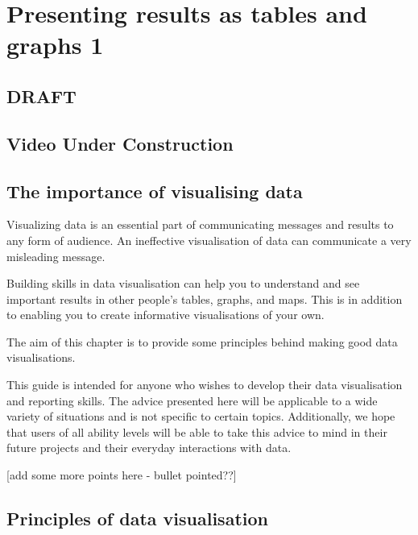 \documentclass[
]{book}
\begin{document}
\hypertarget{tablegraph1}{%
\chapter{Presenting results as tables and graphs 1}\label{tablegraph1}}

\hypertarget{draft}{%
\section{DRAFT}\label{draft}}

\hypertarget{video-under-construction}{%
\section{Video Under Construction}\label{video-under-construction}}

\hypertarget{the-importance-of-visualising-data}{%
\section{The importance of visualising data}\label{the-importance-of-visualising-data}}

Visualizing data is an essential part of communicating messages and results to any form of audience. An ineffective visualisation of data can communicate a very misleading message.

Building skills in data visualisation can help you to understand and see important results in other people's tables, graphs, and maps. This is in addition to enabling you to create informative visualisations of your own.

The aim of this chapter is to provide some principles behind making good data visualisations.

This guide is intended for anyone who wishes to develop their data visualisation and reporting skills. The advice presented here will be applicable to a wide variety of situations and is not specific to certain topics. Additionally, we hope that users of all ability levels will be able to take this advice to mind in their future projects and their everyday interactions with data.

{[}add some more points here - bullet pointed??{]}

\hypertarget{principles-of-data-visualisation}{%
\section{Principles of data visualisation}\label{principles-of-data-visualisation}}
\end{document}

